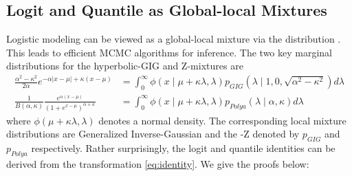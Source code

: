 \documentclass[letterpaper,11pt]{article}
\begin{document}
\subsection{Logit and Quantile as Global-local Mixtures}
Logistic modeling can be viewed as a global-local mixture via the \PG distribution \citep{polson2013bayesian}. This leads to efficient MCMC algorithms for inference. The two key marginal distributions for the hyperbolic-GIG \citep{barndorff1977infinite} and Z-\Polya mixtures \citep{polson2013bayesian,barndorff1982normal} are 
\begin{align}
\frac{\alpha^2-\kappa^2}{2\alpha} e^{-\alpha|x-\mu| + \kappa(x-\mu)} & = \int_0^{\infty} \phi(x \mid \mu + \kappa \lambda, \lambda) p_{GIG}(\lambda \mid 1,0,\sqrt{\alpha^2-\kappa^2}) d\lambda \label{eq:GIG}\\
\frac{1}{B(\alpha,\kappa)} \frac{e^{\alpha(x-\mu)}}{(1+e^{x-\mu})^{\alpha + \kappa}} & = \int_0^{\infty} \phi( x \mid \mu + \kappa \lambda, \lambda) p_{Polya}(\lambda \mid \alpha,\kappa)  d\lambda \label{eq:polya}
\end{align}
where $\phi(\mu + \kappa \lambda, \lambda)$ denotes a normal density. The corresponding local mixture distributions are Generalized Inverse-Gaussian and the \Polya-Z denoted by $p_{GIG}$ and $p_{Polya}$ respectively. Rather surprisingly, the logit and quantile identities can be derived from the \CS transformation \eqref{eq:identity}. We give the proofs below: 
\end{document}
